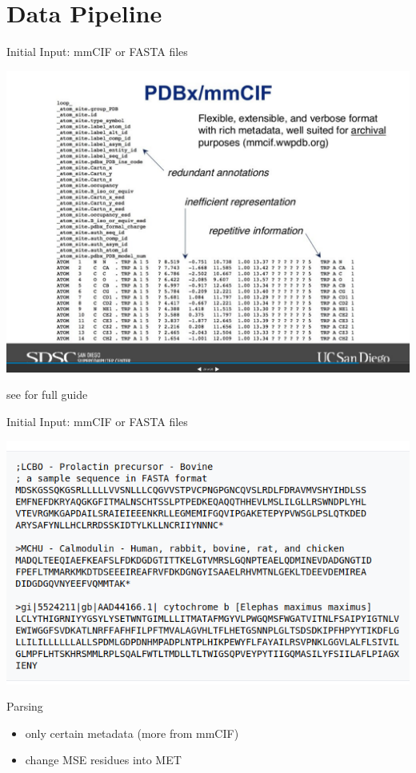\documentclass[presentation, smaller]{beamer}
\begin{document}
\section*{Data Pipeline}
\label{sec:org3009cff}
\begin{frame}[label={sec:orga901d77}]{Initial Input: mmCIF or FASTA files}
\begin{center}
\includegraphics[width=.9\linewidth]{./imgs/mmcif-eg.png}
\end{center}

see \cite{PDB101LearnGuide} for full guide
\end{frame}

\begin{frame}[label={sec:orgb6cb430}]{Initial Input: mmCIF or FASTA files}
\begin{center}
\includegraphics[width=.9\linewidth]{./imgs/fastafiles_2021-07-20.png}
\end{center}
\end{frame}

\begin{frame}[label={sec:org89e0bc5}]{Parsing \cite{jumperHighlyAccurateProtein2021}}
\begin{itemize}
\item only certain metadata (more from mmCIF)
\item change MSE residues into MET
\end{itemize}
\end{frame}
\end{document}
